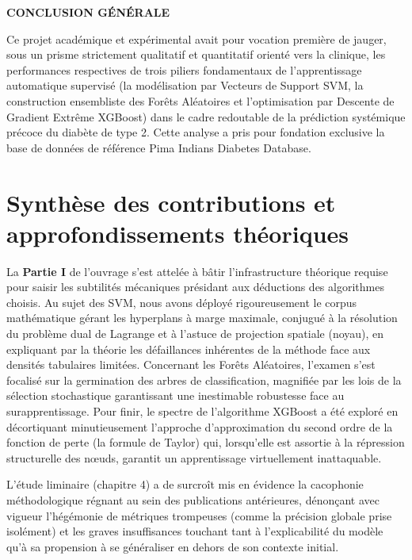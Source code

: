\newpage
\vspace*{7cm}
\begin{center}
  {\Huge\bfseries CONCLUSION GÉNÉRALE}
\end{center}
\vspace*{\fill}

\newpage

Ce projet académique et expérimental avait pour vocation première de jauger, sous un prisme strictement qualitatif et quantitatif orienté vers la clinique, les performances respectives de trois piliers fondamentaux de l'apprentissage automatique supervisé (la modélisation par Vecteurs de Support SVM, la construction ensembliste des Forêts Aléatoires et l'optimisation par Descente de Gradient Extrême XGBoost) dans le cadre redoutable de la prédiction systémique précoce du diabète de type 2. Cette analyse a pris pour fondation exclusive la base de données de référence Pima Indians Diabetes Database.

\section*{Synthèse des contributions et approfondissements théoriques}

La \textbf{Partie I} de l'ouvrage s'est attelée à bâtir l'infrastructure théorique requise pour saisir les subtilités mécaniques présidant aux déductions des algorithmes choisis. Au sujet des SVM, nous avons déployé rigoureusement le corpus mathématique gérant les hyperplans à marge maximale, conjugué à la résolution du problème dual de Lagrange et à l'astuce de projection spatiale (noyau), en expliquant par la théorie les défaillances inhérentes de la méthode face aux densités tabulaires limitées. Concernant les Forêts Aléatoires, l'examen s'est focalisé sur la germination des arbres de classification, magnifiée par les lois de la sélection stochastique garantissant une inestimable robustesse face au surapprentissage. Pour finir, le spectre de l'algorithme XGBoost a été exploré en décortiquant minutieusement l'approche d'approximation du second ordre de la fonction de perte (la formule de Taylor) qui, lorsqu'elle est assortie à la répression structurelle des nœuds, garantit un apprentissage virtuellement inattaquable.

L'étude liminaire (chapitre 4) a de surcroît mis en évidence la cacophonie méthodologique régnant au sein des publications antérieures, dénonçant avec vigueur l'hégémonie de métriques trompeuses (comme la précision globale prise isolément) et les graves insuffisances touchant tant à l'explicabilité du modèle qu'à sa propension à se généraliser en dehors de son contexte initial.

